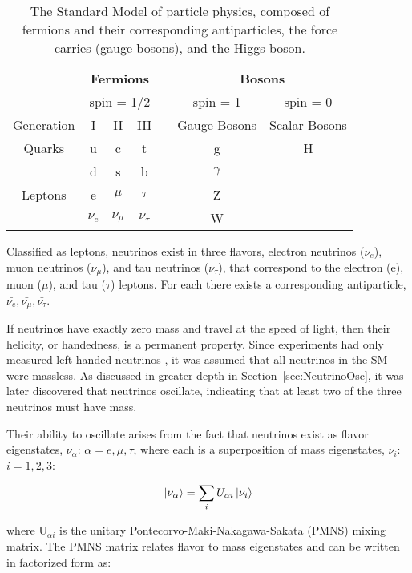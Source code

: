 \begin{table}
	\centering
\begin{tabular}{|c|c|c|c|c|c|c|}
	\hline 
	& \multicolumn{3}{c|}{\textbf{Fermions}} & & \multicolumn{2}{c|}{\textbf{Bosons}}  \\ 
	& \multicolumn{3}{c|}{spin = 1/2} & & spin = 1 & spin = 0 \\
	\hline 
	Generation & I & II & III & & Gauge Bosons & Scalar Bosons \\ 
	\hline 
	Quarks & u & c & t & & g & H \\ 
	& d & s & b & & $\gamma$ &  \\ 
	Leptons & e & $\mu$ & $\tau$ & &  Z &  \\ 
	& $\nu_{e}$ & $\nu_{\mu}$ & $\nu_{\tau}$ & & W &  \\ 
	\hline 
\end{tabular}
\caption[The Standed Model of Particle Physics]{The Standard Model of particle physics, composed of fermions and their corresponding antiparticles, the force carries (gauge bosons), and the Higgs boson.}
\label{tab:SM}
\end{table}

Classified as leptons, neutrinos exist in three flavors, electron neutrinos ($\nu_{e}$), muon neutrinos ($\nu_{\mu}$), and tau neutrinos ($\nu_{\tau}$), that correspond to the electron (e), muon ($\mu$), and tau ($\tau$) leptons.
For each there exists a corresponding antiparticle, $\bar{\nu_e}, \bar{\nu_\mu}, \bar{\nu_\tau}$.

If neutrinos have exactly zero mass and travel at the speed of light, then their helicity, or handedness, is a permanent property. 
Since experiments had only measured left-handed neutrinos \cite{PhysRev.109.1015}, it was assumed that all neutrinos in the SM were massless.
As discussed in greater depth in Section~\ref{sec:NeutrinoOsc}, it was later discovered that neutrinos oscillate, indicating that at least two of the three neutrinos must have mass.

Their ability to oscillate arises from the fact that neutrinos exist as flavor eigenstates, $\nu_\alpha$: $\alpha = e, \mu, \tau$, where each is a superposition of mass eigenstates, $\nu_i$: $i = 1, 2, 3$:

\begin{equation}
	\ket{\nu_\alpha} = \sum_{i}U_{\alpha i}\ket{\nu_i}
\end{equation}

where U$_{\alpha i}$ is the unitary Pontecorvo-Maki-Nakagawa-Sakata (PMNS) mixing matrix. 
The PMNS matrix relates flavor to mass eigenstates and can be written in factorized form as:


